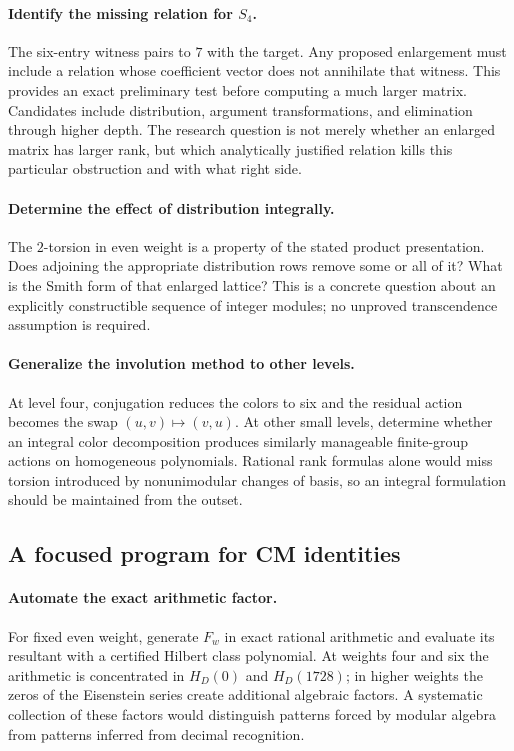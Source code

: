 \paragraph{Identify the missing relation for $S_4$.}
The six-entry witness pairs to $7$ with the target. Any proposed
enlargement must include a relation whose coefficient vector does not
annihilate that witness. This provides an exact preliminary test before
computing a much larger matrix. Candidates include distribution,
argument transformations, and elimination through higher depth. The
research question is not merely whether an enlarged matrix has larger
rank, but which analytically justified relation kills this particular
obstruction and with what right side.

\paragraph{Determine the effect of distribution integrally.}
The $2$-torsion in even weight is a property of the stated product
presentation. Does adjoining the appropriate distribution rows remove
some or all of it? What is the Smith form of that enlarged lattice?
This is a concrete question about an explicitly constructible sequence of
integer modules; no unproved transcendence assumption is required.

\paragraph{Generalize the involution method to other levels.}
At level four, conjugation reduces the colors to six and the residual
action becomes the swap $(u,v)\mapsto(v,u)$. At other small levels,
determine whether an integral color decomposition produces similarly
manageable finite-group actions on homogeneous polynomials. Rational
rank formulas alone would miss torsion introduced by nonunimodular
changes of basis, so an integral formulation should be maintained from
the outset.

\subsection{A focused program for CM identities}

\paragraph{Automate the exact arithmetic factor.}
For fixed even weight, generate $F_w$ in exact rational arithmetic and
evaluate its resultant with a certified Hilbert class polynomial.
At weights four and six the arithmetic is concentrated in
$H_D(0)$ and $H_D(1728)$; in higher weights the zeros of the Eisenstein
series create additional algebraic factors. A systematic collection of
these factors would distinguish patterns forced by modular algebra from
patterns inferred from decimal recognition.

